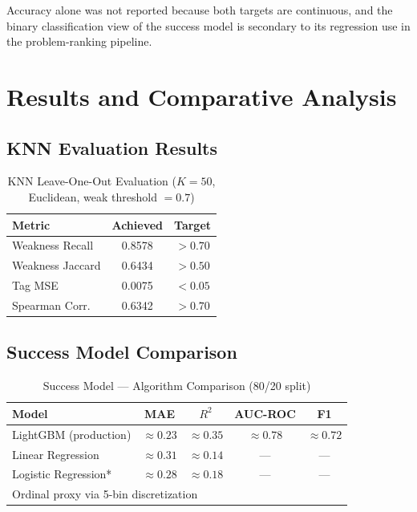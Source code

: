 \documentclass[12pt,a4paper]{article}
\begin{document}
Accuracy alone was not reported because both targets are continuous, and the
binary classification view of the success model is secondary to its regression
use in the problem-ranking pipeline.

\section{Results and Comparative Analysis}

\subsection*{KNN Evaluation Results}

\begin{table}[H]
\centering
\caption{KNN Leave-One-Out Evaluation ($K=50$, Euclidean, weak threshold $= 0.7$)}
\begin{tabular}{|l|c|c|}
\hline
\textbf{Metric} & \textbf{Achieved} & \textbf{Target} \\
\hline
Weakness Recall     & 0.8578 & $> 0.70$ \\
Weakness Jaccard    & 0.6434 & $> 0.50$ \\
Tag MSE             & 0.0075 & $< 0.05$ \\
Spearman Corr.      & 0.6342 & $> 0.70$ \\
\hline
\end{tabular}
\end{table}

\subsection*{Success Model Comparison}

\begin{table}[H]
\centering
\caption{Success Model --- Algorithm Comparison (80/20 split)}
\begin{tabular}{|l|c|c|c|c|}
\hline
\textbf{Model} & \textbf{MAE} & \textbf{$R^2$} & \textbf{AUC-ROC} & \textbf{F1} \\
\hline
LightGBM (production) & $\approx 0.23$ & $\approx 0.35$ & $\approx 0.78$ & $\approx 0.72$ \\
Linear Regression     & $\approx 0.31$ & $\approx 0.14$ & ---            & --- \\
Logistic Regression*  & $\approx 0.28$ & $\approx 0.18$ & ---            & --- \\
\hline
\multicolumn{5}{l}{\small * Ordinal proxy via 5-bin discretization} \\
\end{tabular}
\end{table}
\end{document}
